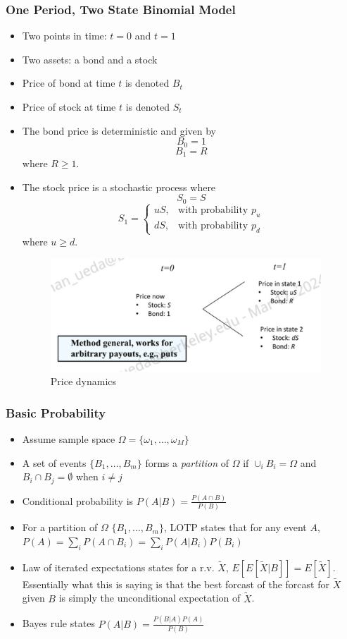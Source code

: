 \documentclass[11pt]{article}
\begin{document}
\subsubsection{One Period, Two State Binomial Model}
\begin{itemize}
    \item Two points in time: $t=0$ and $t=1$
    \item Two assets: a bond and a stock 
    \item Price of bond at time $t$ is denoted $B_t$
    \item Price of stock at time $t$ is denoted $S_t$
    \item The bond price is deterministic and given by 
    \[B_0 = 1\]
    \[B_1 = R\]
    where $R \ge 1$.
    \item The stock price is a stochastic process where 
    \[S_0 = S\]
    \[
    S_1 = \begin{cases}
        uS, & \text{with probability } p_u \\
        dS, & \text{with probability } p_d
    \end{cases}
    \] where $u \ge d$.

    \begin{figure}[H] 
        \centering 
        \includegraphics[width=4in]{imgs/one_period_two_state_bin_tree_model.png}
        \caption{Price dynamics}
    \end{figure}
\end{itemize}

\subsubsection{Basic Probability}
\begin{itemize}
    \item Assume sample space $\Omega = \{\omega_1, \ldots, \omega_M\}$
    \item A set of events $\{B_1, \ldots, B_m\}$ forms a \textit{partition} of $\Omega$ if 
    $\cup_i B_i = \Omega$ and $B_i \cap B_j = \emptyset$ when $i \ne j$
    \item Conditional probability is $P(A|B) = \frac{P(A \cap B)}{P(B)}$
    \item For a partition of $\Omega$ $\{B_1, \ldots, B_m\}$, LOTP states that for any event 
    $A$, $P(A)= \sum_i P(A \cap B_i) = \sum_i P(A|B_i)P(B_i)$
    \item Law of iterated expectations states for a r.v. $\tilde{X}$, $E[E[\tilde{X}|B]] = 
    E[\tilde{X}]$. Essentially what this is saying is that the best forcast of the forcast for
    $\tilde{X}$ given $B$ is simply the unconditional expectation of $\tilde{X}$.
    \item Bayes rule states $P(A|B) = \frac{P(B|A)P(A)}{P(B)}$
\end{itemize}
\end{document}
